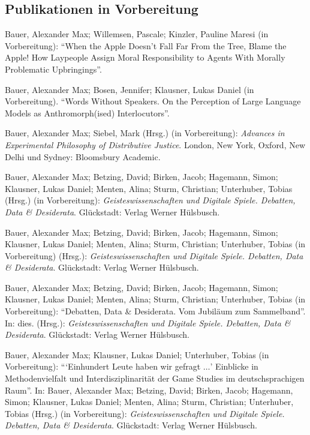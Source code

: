 \documentclass[a4paper,10pt]{article}
\newenvironment{literature}{%
   \parskip6pt\parindent0pt\raggedright
   \def\lititem{\hangindent=1cm\hangafter1}}{%
   \par\ignorespaces}
\begin{document}
\subsection*{Publikationen in Vorbereitung}
\begin{literature}
\lititem Bauer, Alexander Max; Willemsen, Pascale; Kinzler, Pauline Maresi (in Vorbereitung): \enquote{When the Apple Doesn't Fall Far From the Tree, Blame the Apple! How Laypeople Assign Moral Responsibility to Agents With Morally Problematic Upbringings}.

\lititem Bauer, Alexander Max; Bosen, Jennifer; Klausner, Lukas Daniel (in Vorbereitung). \enquote{Words Without Speakers. On the Perception of Large Language Models as Anthromorph(ised) Interlocutors}.

\lititem Bauer, Alexander Max; Siebel, Mark (Hrsg.) (in Vorbereitung): \textit{Advances in Experimental Philosophy of Distributive Justice}. London, New York, Oxford, New Delhi und Sydney: Bloomsbury Academic.

\lititem Bauer, Alexander Max; Betzing, David; Birken, Jacob; Hagemann, Simon; Klausner, Lukas Daniel; Menten, Alina; Sturm, Christian; Unterhuber, Tobias (Hrsg.) (in Vorbereitung): \textit{Geisteswissenschaften und Digitale Spiele. Debatten, Data \& Desiderata}. Glückstadt: Verlag Werner Hülsbusch.

\lititem Bauer, Alexander Max; Betzing, David; Birken, Jacob; Hagemann, Simon; Klausner, Lukas Daniel; Menten, Alina; Sturm, Christian; Unterhuber, Tobias (in Vorbereitung) (Hrsg.): \textit{Geisteswissenschaften und Digitale Spiele. Debatten, Data \& Desiderata}. Glückstadt: Verlag Werner Hülsbusch.

\lititem Bauer, Alexander Max; Betzing, David; Birken, Jacob; Hagemann, Simon; Klausner, Lukas Daniel; Menten, Alina; Sturm, Christian; Unterhuber, Tobias (in Vorbereitung): \enquote{Debatten, Data \& Desiderata. Vom Jubiläum zum Sammelband}. In: dies. (Hrsg.): \textit{Geisteswissenschaften und Digitale Spiele. Debatten, Data \& Desiderata}. Glückstadt: Verlag Werner Hülsbusch.

\lititem Bauer, Alexander Max; Klausner, Lukas Daniel; Unterhuber, Tobias (in Vorbereitung): \enquote{\enquote{Einhundert Leute haben wir gefragt $\ldots$} Einblicke in Methodenvielfalt und Interdisziplinarität der Game Studies im deutschsprachigen Raum}. In: Bauer, Alexander Max; Betzing, David; Birken, Jacob; Hagemann, Simon; Klausner, Lukas Daniel; Menten, Alina; Sturm, Christian; Unterhuber, Tobias (Hrsg.) (in Vorbereitung): \textit{Geisteswissenschaften und Digitale Spiele. Debatten, Data \& Desiderata}. Glückstadt: Verlag Werner Hülsbusch.


\end{literature}
\end{document}
